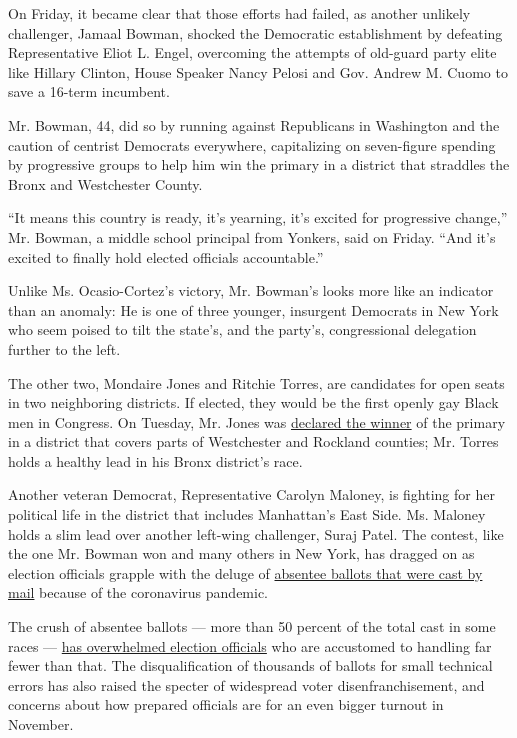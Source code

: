 On Friday, it became clear that those efforts had failed, as another
unlikely challenger, Jamaal Bowman, shocked the Democratic establishment
by defeating Representative Eliot L. Engel, overcoming the attempts of
old-guard party elite like Hillary Clinton, House Speaker Nancy Pelosi
and Gov. Andrew M. Cuomo to save a 16-term incumbent.

Mr. Bowman, 44, did so by running against Republicans in Washington and
the caution of centrist Democrats everywhere, capitalizing on
seven-figure spending by progressive groups to help him win the primary
in a district that straddles the Bronx and Westchester County.

``It means this country is ready, it's yearning, it's excited for
progressive change,'' Mr. Bowman, a middle school principal from
Yonkers, said on Friday. ``And it's excited to finally hold elected
officials accountable.''

Unlike Ms. Ocasio-Cortez's victory, Mr. Bowman's looks more like an
indicator than an anomaly: He is one of three younger, insurgent
Democrats in New York who seem poised to tilt the state's, and the
party's, congressional delegation further to the left.

The other two, Mondaire Jones and Ritchie Torres, are candidates for
open seats in two neighboring districts. If elected, they would be the
first openly gay Black men in Congress. On Tuesday, Mr. Jones was
\href{https://www.nytimes.com/2020/07/14/nyregion/mondaire-jones-house-primary.html}{declared
the winner} of the primary in a district that covers parts of
Westchester and Rockland counties; Mr. Torres holds a healthy lead in
his Bronx district's race.

Another veteran Democrat, Representative Carolyn Maloney, is fighting
for her political life in the district that includes Manhattan's East
Side. Ms. Maloney holds a slim lead over another left-wing challenger,
Suraj Patel. The contest, like the one Mr. Bowman won and many others in
New York, has dragged on as election officials grapple with the deluge
of
\href{https://www.nytimes.com/2020/08/03/nyregion/nyc-mail-ballots-voting.html}{absentee
ballots that were cast by mail} because of the coronavirus pandemic.

The crush of absentee ballots --- more than 50 percent of the total cast
in some races ---
\href{https://www.nytimes.com/2020/07/17/nyregion/election-absentee-ballots-primary.html}{has
overwhelmed election officials} who are accustomed to handling far fewer
than that. The disqualification of thousands of ballots for small
technical errors has also raised the specter of widespread voter
disenfranchisement, and concerns about how prepared officials are for an
even bigger turnout in November.

